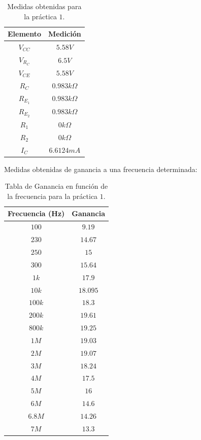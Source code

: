 \documentclass[11pt,graphicx,caption,rotating]{article}
\begin{document}
\begin{table}[H]
	\centering
\begin{tabular}{|c|c|}\hline
\textbf{Elemento} & \textbf{Medición} \\ \hline
$V_{CC}$ & $5.58V$ \\ \hline
$V_{R_C}$ & $6.5 V$ \\ \hline
$V_{CE}$ & $5.58V$ \\ \hline
$R_C$ & $0.983 k\Omega$ \\ \hline
$R_{E_1}$ & $0.983 k\Omega$ \\ \hline
$R_{E_2}$ & $0.983 k\Omega$ \\ \hline
$R_1$ & $0 k\Omega$ \\ \hline
$R_2$ & $0 k\Omega$ \\ \hline
$I_C$ & $6.6124 mA$ \\ \hline
    \end{tabular}
	\caption{Medidas obtenidas para la práctica $1$.}
	\label{tab1}
\end{table}
\noindent
Medidas obtenidas de ganancia a una frecuencia determinada:
\begin{table}[H]
	\centering
\begin{tabular}{|c|c|}\hline
 \textbf{Frecuencia (Hz)} & \textbf{Ganancia} \\ \hline
$100$ & $9.19$ \\ \hline
$230$ & $14.67$ \\ \hline
$250$ & $15$ \\ \hline
$300$ & $15.64$ \\ \hline
$1k$ & $17.9$ \\ \hline
$10k$ & $18.095$ \\ \hline
$100k$ & $18.3$ \\ \hline
$200k$ & $19.61$ \\ \hline
$800k$ & $19.25$ \\ \hline
$1M$ & $19.03$ \\ \hline
$2M$ & $19.07$ \\ \hline
$3M$ & $18.24$ \\ \hline
$4M$ & $17.5$ \\ \hline
$5M$ & $16$ \\ \hline
$6M$ & $14.6$ \\ \hline
$6.8M$ & $14.26$ \\ \hline
$7M$ & $13.3$ \\ \hline
    \end{tabular}
	\caption{Tabla de  Ganancia en función de la frecuencia para la práctica $1$.}
	\label{tab2}
\end{table}
\end{document}
